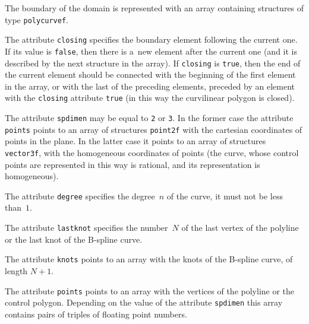 \vspace{\medskipamount}
The boundary of the domain is represented with an array containing
structures of type \texttt{polycurvef}.

\vspace{\bigskipamount}
The attribute \texttt{closing} specifies the boundary element following
the current one. If its value is \texttt{false}, then there is a~new element
after the current one (and it is described by the next structure in the array).
If \texttt{closing} is \texttt{true}, then the end of the current element
should be connected with the beginning of the first element in the array,
or with the last of the preceding elements, preceded by an element
with the \texttt{closing} attribute \texttt{true}
(in this way the curvilinear polygon is closed).

\begin{sloppypar}
The attribute \texttt{spdimen} may be equal to \texttt{2} or \texttt{3}.
In the former case the attribute \texttt{points} points to an array
of structures \texttt{point2f} with the cartesian coordinates of points
in the plane. In the latter case it points to an array of structures
\texttt{vector3f}, with the homogeneous coordinates of points
(the curve, whose control points are represented in this way
is rational, and its representation is homogeneous).
\end{sloppypar}

The attribute \texttt{degree} specifies the degree~$n$ of the curve,
it must not be less than~$1$.

The attribute \texttt{lastknot} specifies the number~$N$ of the last
vertex of the polyline or the last knot of the B-spline curve.

The attribute \texttt{knots} points to an array with the knots of
the B-spline curve, of length $N+1$.

The attribute \texttt{points} points to an array with the vertices of the
polyline or the control polygon. Depending on the value of the attribute
\texttt{spdimen} this array contains pairs of triples of floating point
numbers.

